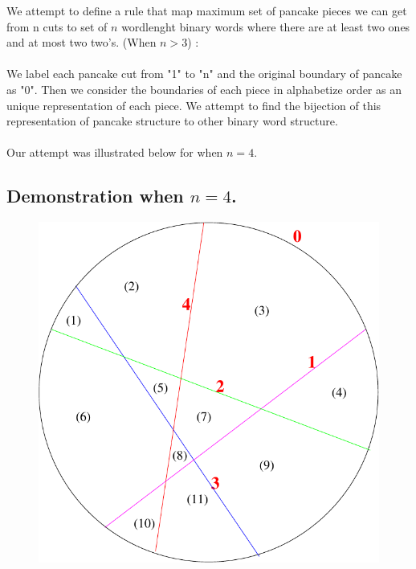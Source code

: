 \documentclass[a4paper,10pt]{article}
\begin{document}
We attempt to define a rule that map maximum set of pancake pieces we can get from n cuts to set of $n$ wordlenght binary words where there are at least two ones and at most two two's. (When  $n > 3$) : \\
\\
We label each pancake cut from "1" to "n" and the original boundary of pancake as "0". Then we consider the boundaries of each piece in alphabetize order as an unique representation of each piece. We attempt to find the bijection of this representation of pancake structure to other binary word structure.\\
\\
Our attempt was illustrated below for when $n=4$.    	    
\\	
\subsection{Demonstration when $n=4$.}
\begin{figure}[h!]
			\includegraphics[scale=0.5]{graphics/pancakecut11_bijec}
			\captionsetup{labelformat=empty}
			\caption{}
			\label{fig:pancakecut11}
\end{figure}
\end{document}
